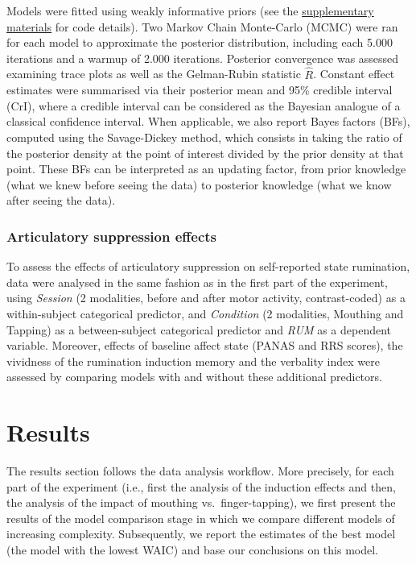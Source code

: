 \documentclass[a4paper,12pt,twoside,onecolumn,openright,final,oldfontcommands]{memoir}
\begin{document}
Models were fitted using weakly informative priors (see the \protect\hyperlink{supp}{supplementary materials} for code details). Two Markov Chain Monte-Carlo (MCMC) were ran for each model to approximate the posterior distribution, including each 5.000 iterations and a warmup of 2.000 iterations. Posterior convergence was assessed examining trace plots as well as the Gelman-Rubin statistic \(\hat{R}\). Constant effect estimates were summarised via their posterior mean and 95\% credible interval (CrI), where a credible interval can be considered as the Bayesian analogue of a classical confidence interval. When applicable, we also report Bayes factors (BFs), computed using the Savage-Dickey method, which consists in taking the ratio of the posterior density at the point of interest divided by the prior density at that point. These BFs can be interpreted as an updating factor, from prior knowledge (what we knew before seeing the data) to posterior knowledge (what we know after seeing the data).

\hypertarget{articulatory-suppression-effects}{%
\subsubsection{Articulatory suppression effects}\label{articulatory-suppression-effects}}

To assess the effects of articulatory suppression on self-reported state rumination, data were analysed in the same fashion as in the first part of the experiment, using \emph{Session} (2 modalities, before and after motor activity, contrast-coded) as a within-subject categorical predictor, and \emph{Condition} (2 modalities, Mouthing and Tapping) as a between-subject categorical predictor and \emph{RUM} as a dependent variable. Moreover, effects of baseline affect state (PANAS and RRS scores), the vividness of the rumination induction memory and the verbality index were assessed by comparing models with and without these additional predictors.

\hypertarget{results-3}{%
\section{Results}\label{results-3}}

The results section follows the data analysis workflow. More precisely, for each part of the experiment (i.e., first the analysis of the induction effects and then, the analysis of the impact of mouthing vs.~finger-tapping), we first present the results of the model comparison stage in which we compare different models of increasing complexity. Subsequently, we report the estimates of the best model (the model with the lowest WAIC) and base our conclusions on this model.
\end{document}
